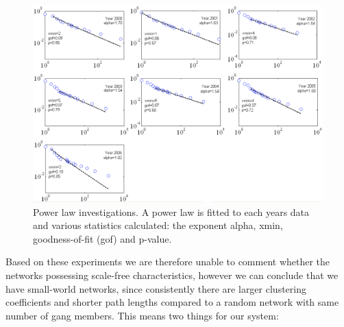 \documentclass[twocolumn]{svjour3}          %
\theoremstyle{definition}
\begin{document}
\begin{figure}[!ht]
\centering
\includegraphics[width=\textwidth]{images/clausetcumulative}
\caption{Power law investigations. A power law is fitted to each years data and various statistics calculated: the exponent alpha, xmin, goodness-of-fit (gof) and p-value.}
\label{fig:clausetcumulative}
\end{figure}


\begin{table}[htb]
\caption{Power law exponents for gangs, against years. Significant results are shown in bold-face.}
\label{tab:clausetgangyears}
\end{table}

Based on these experiments we are therefore unable to comment whether
the networks possessing scale-free characteristics, however we can
conclude that we have small-world networks, since consistently there
are larger clustering coefficients and shorter path lengths compared
to a random network with same number of gang members. This means two
things for our system:
\end{document}
